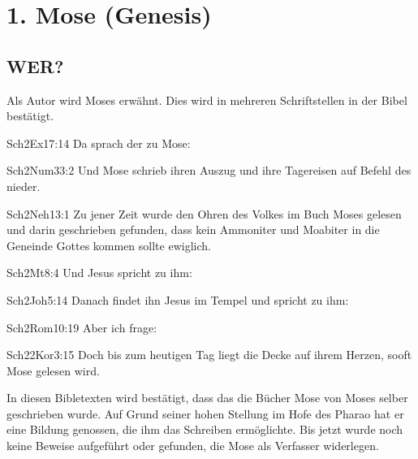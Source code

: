 \section{1. Mose (Genesis)}
\subsection{WER?}
Als Autor wird Moses erwähnt. Dies wird in mehreren Schriftstellen in der Bibel bestätigt.
\begin{bibeltext}{Sch2}{Ex}{17:14}
	Da sprach der \herr{} zu Mose: 
\end{bibeltext}
\begin{bibeltext}{Sch2}{Num}{33:2}
    Und Mose schrieb ihren Auszug und ihre Tagereisen auf Befehl des \herr{} nieder.
\end{bibeltext}

\begin{bibeltext}{Sch2}{Neh}{13:1}
    Zu jener Zeit wurde den Ohren des Volkes im Buch Moses gelesen und darin geschrieben gefunden, dass kein Ammoniter und Moabiter in die Geneinde Gottes kommen sollte ewiglich.
\end{bibeltext}
\begin{bibeltext}{Sch2}{Mt}{8:4}
    Und Jesus spricht zu ihm: 
\end{bibeltext}
\begin{bibeltext}{Sch2}{Joh}{5:14}
    Danach findet ihn Jesus im Tempel und spricht zu ihm: 
\end{bibeltext}
\begin{bibeltext}{Sch2}{Rom}{10:19}
    Aber ich frage: 
\end{bibeltext}
\begin{bibeltext}{Sch2}{2Kor}{3:15}
   Doch bis zum heutigen Tag liegt die Decke auf ihrem Herzen, sooft Mose gelesen wird. 
\end{bibeltext}
In diesen Bibletexten wird bestätigt, dass das die Bücher Mose von Moses selber geschrieben wurde. Auf Grund seiner hohen Stellung im Hofe des Pharao hat er eine Bildung genossen, die ihm das Schreiben ermöglichte. Bis jetzt wurde noch keine Beweise aufgeführt oder gefunden, die Mose als Verfasser widerlegen.
